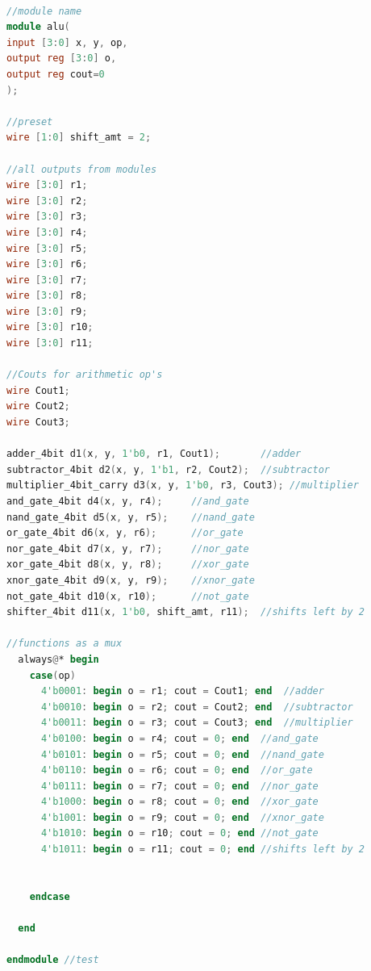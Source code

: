\documentclass[runningheads, 12pt]{report}
\begin{document}
\begin{lstlisting}[language=Verilog, caption={ALU Circuit Verilog}]

//module name
module alu(
input [3:0] x, y, op,
output reg [3:0] o,
output reg cout=0
);

//preset
wire [1:0] shift_amt = 2;				

//all outputs from modules
wire [3:0] r1;						
wire [3:0] r2;
wire [3:0] r3;
wire [3:0] r4;
wire [3:0] r5;
wire [3:0] r6;
wire [3:0] r7;
wire [3:0] r8;
wire [3:0] r9;
wire [3:0] r10;
wire [3:0] r11;

//Couts for arithmetic op's
wire Cout1;						
wire Cout2;
wire Cout3;

adder_4bit d1(x, y, 1'b0, r1, Cout1);		//adder
subtractor_4bit d2(x, y, 1'b1, r2, Cout2);	//subtractor
multiplier_4bit_carry d3(x, y, 1'b0, r3, Cout3); //multiplier
and_gate_4bit d4(x, y, r4);		//and_gate
nand_gate_4bit d5(x, y, r5);	//nand_gate
or_gate_4bit d6(x, y, r6);		//or_gate
nor_gate_4bit d7(x, y, r7);		//nor_gate
xor_gate_4bit d8(x, y, r8);		//xor_gate
xnor_gate_4bit d9(x, y, r9);	//xnor_gate
not_gate_4bit d10(x, r10);		//not_gate
shifter_4bit d11(x, 1'b0, shift_amt, r11); 	//shifts left by 2

//functions as a mux
  always@* begin					
    case(op)
      4'b0001: begin o = r1; cout = Cout1; end	//adder
      4'b0010: begin o = r2; cout = Cout2; end	//subtractor
      4'b0011: begin o = r3; cout = Cout3; end	//multiplier
      4'b0100: begin o = r4; cout = 0; end	//and_gate
      4'b0101: begin o = r5; cout = 0; end	//nand_gate
      4'b0110: begin o = r6; cout = 0; end	//or_gate
      4'b0111: begin o = r7; cout = 0; end	//nor_gate
      4'b1000: begin o = r8; cout = 0; end	//xor_gate
      4'b1001: begin o = r9; cout = 0; end	//xnor_gate
      4'b1010: begin o = r10; cout = 0; end	//not_gate
      4'b1011: begin o = r11; cout = 0; end	//shifts left by 2

  
    endcase

  end
					
endmodule //test

\end{lstlisting}
\end{document}
